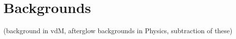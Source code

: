 \section{Backgrounds}
\label{sec:bkg}
(background in vdM, afterglow backgrounds in Physics, subtraction of these)


